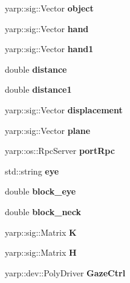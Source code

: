 \begin{DoxyCompactItemize}
\item 
yarp\+::sig\+::\+Vector {\bfseries object}\label{classGraspingModule_a4b3ada8a9325ed821e73b8e84375c4fa}

\item 
yarp\+::sig\+::\+Vector {\bfseries hand}\label{classGraspingModule_af8308a8938957b4bb50c260dc42d7b27}

\item 
yarp\+::sig\+::\+Vector {\bfseries hand1}\label{classGraspingModule_a0b4986d666ef55b1c769d1b02b49c86f}

\item 
double {\bfseries distance}\label{classGraspingModule_af1912ddc2800fb3101e98a99d3b04b5b}

\item 
double {\bfseries distance1}\label{classGraspingModule_aacb0581ba76204e825aee632cf9679e4}

\item 
yarp\+::sig\+::\+Vector {\bfseries displacement}\label{classGraspingModule_a52131b73f3688ab8524f37b8e1945717}

\item 
yarp\+::sig\+::\+Vector {\bfseries plane}\label{classGraspingModule_a234e3ab635ba9b581e6877519dc633b6}

\item 
yarp\+::os\+::\+Rpc\+Server {\bfseries port\+Rpc}\label{classGraspingModule_a164dc4c91253669941ad45e2702bb746}

\item 
std\+::string {\bfseries eye}\label{classGraspingModule_a2d764f516aecffb52ba22f1dcdd2a730}

\item 
double {\bfseries block\+\_\+eye}\label{classGraspingModule_a9562cc675af9a861201956fe23a267bc}

\item 
double {\bfseries block\+\_\+neck}\label{classGraspingModule_aa92c21ad6a4a5f70f73ebf3281676f62}

\item 
yarp\+::sig\+::\+Matrix {\bfseries K}\label{classGraspingModule_a161a8c4d8bc2db6e1cf7c00a69953831}

\item 
yarp\+::sig\+::\+Matrix {\bfseries H}\label{classGraspingModule_acb55c5d37d9a7225b44323d2be724bfe}

\item 
yarp\+::dev\+::\+Poly\+Driver {\bfseries Gaze\+Ctrl}\label{classGraspingModule_adfed9afcb5290a5ee2e99768352fd4fb}


\end{DoxyCompactItemize}

